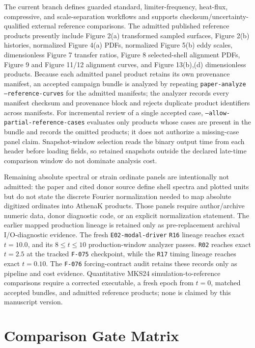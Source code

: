 \documentclass[11pt]{article}
\begin{document}
The current branch defines guarded standard, limiter-frequency, heat-flux,
compressive, and scale-separation workflows and supports
checksum/uncertainty-qualified external reference comparisons.  The admitted
published reference products presently include Figure 2(a) transformed
sampled surfaces, Figure 2(b) histories, normalized Figure 4(a) PDFs,
normalized Figure 5(b) eddy scales, dimensionless Figure 7 transfer ratios,
Figure 8 selected-shell alignment PDFs, Figure 9 and Figure 11/12 alignment
curves, and Figure 13(b),(d) dimensionless products.  Because each admitted
panel product retains its own provenance manifest, an accepted campaign
bundle is analyzed by repeating \texttt{paper-analyze --reference-curves}
for the admitted manifests; the analyzer records every manifest checksum and
provenance block and rejects duplicate product identifiers across manifests.
For incremental review of a single accepted case,
\texttt{--allow-partial-reference-cases} evaluates only products whose cases
are present in the bundle and records the omitted products; it does not
authorize a missing-case panel claim.  Snapshot-window selection reads the
binary output time from each header before loading fields, so retained
snapshots outside the declared late-time comparison window do not dominate
analysis cost.

Remaining absolute spectral or strain ordinate panels are intentionally not
admitted: the paper and cited donor source define shell spectra and plotted
units but do not state the discrete Fourier normalization needed to map
absolute digitized ordinates into AthenaK products.  Those panels require
author/archive numeric data, donor diagnostic code, or an explicit
normalization statement.  The earlier mapped production lineage is retained
only as pre-replacement archival I/O-diagnostic evidence.  The fresh
\texttt{E02-modal-driver} \texttt{R16} lineage reaches exact \(t=10.0\), and
its \(8\leq t\leq10\) production-window analyzer passes.  \texttt{R02}
reaches exact \(t=2.5\) at the tracked \texttt{F-075} checkpoint, while the
\texttt{R17} timing lineage reaches exact \(t=0.10\).  The \texttt{F-076}
forcing-contract audit retains these records only as pipeline and cost
evidence.  Quantitative MKS24 simulation-to-reference comparisons require a
corrected executable, a fresh epoch from \(t=0\), matched accepted bundles,
and admitted reference products; none is claimed by this
manuscript version.

\section{Comparison Gate Matrix}
\end{document}
